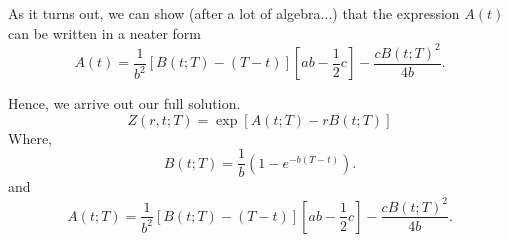\documentclass[11pt]{article}
\begin{document}
As it turns out, we can show (after a lot of algebra...) that the expression $A(t)$ can be written in a neater form
\begin{equation}
    A(t) = \frac{1}{b^2} \left[ B(t;T) - (T-t) \right] \left[ ab - \frac{1}{2} c \right] - \frac{c B(t;T)^2}{4b}.
\end{equation}

Hence, we arrive out our full solution.
\begin{equation}
    Z(r,t;T) = \exp \left[ A(t;T) - r B(t;T) \right]
\end{equation}
Where,
\begin{equation}
    B(t;T) = \frac{1}{b} (1 - e^{-b (T-t)}).
\end{equation}
and
\begin{equation}
    A(t;T) = \frac{1}{b^2} \left[ B(t;T) - (T-t) \right] \left[ ab - \frac{1}{2} c \right] - \frac{c B(t;T)^2}{4b}.
\end{equation}
\end{document}

